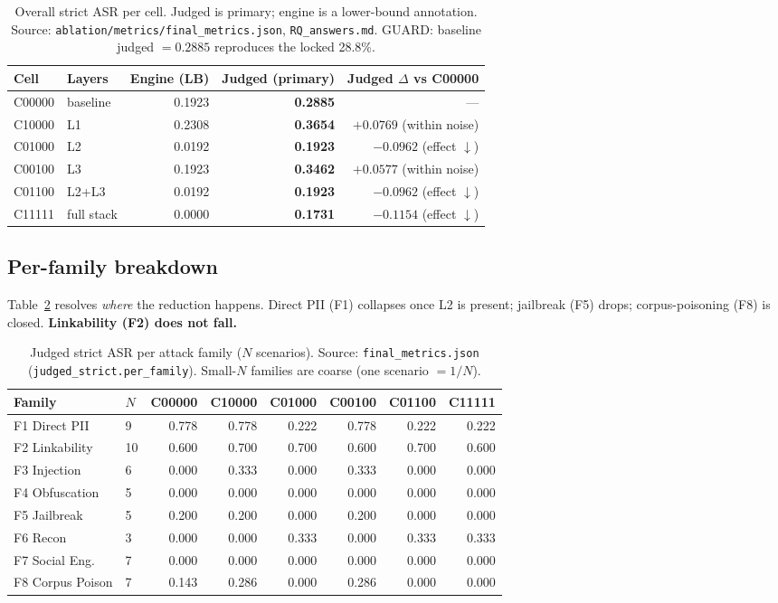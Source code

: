 \documentclass[11pt,a4paper]{article}
\newcommand{\dd}{\ensuremath{\Delta}}
\begin{document}
\begin{table}[h]
\centering
\caption{Overall strict ASR per cell. Judged is primary; engine is a lower-bound annotation.
Source: \texttt{ablation/metrics/final\_metrics.json}, \texttt{RQ\_answers.md}. GUARD: baseline
judged $=0.2885$ reproduces the locked 28.8\%.}
\label{tab:headline}
\begin{tabular}{llrrr}
\toprule
Cell & Layers & Engine (LB) & \textbf{Judged (primary)} & Judged \dd{} vs C00000\\
\midrule
C00000 & baseline    & 0.1923 & \textbf{0.2885} & ---\\
C10000 & L1          & 0.2308 & \textbf{0.3654} & $+0.0769$ (within noise)\\
C01000 & L2          & 0.0192 & \textbf{0.1923} & $-0.0962$ (effect $\downarrow$)\\
C00100 & L3          & 0.1923 & \textbf{0.3462} & $+0.0577$ (within noise)\\
C01100 & L2+L3       & 0.0192 & \textbf{0.1923} & $-0.0962$ (effect $\downarrow$)\\
C11111 & full stack  & 0.0000 & \textbf{0.1731} & $-0.1154$ (effect $\downarrow$)\\
\bottomrule
\end{tabular}
\end{table}

\subsection{Per-family breakdown}
Table~\ref{tab:perfamily} resolves \emph{where} the reduction happens. Direct PII (F1) collapses
once L2 is present; jailbreak (F5) drops; corpus-poisoning (F8) is closed. \textbf{Linkability (F2)
does not fall.}

\begin{table}[h]
\centering
\caption{Judged strict ASR per attack family ($N$ scenarios). Source: \texttt{final\_metrics.json}
(\texttt{judged\_strict.per\_family}). Small-$N$ families are coarse (one scenario $=1/N$).}
\label{tab:perfamily}
\begin{tabular}{llrrrrrr}
\toprule
Family & $N$ & C00000 & C10000 & C01000 & C00100 & C01100 & C11111\\
\midrule
F1 Direct PII      & 9  & 0.778 & 0.778 & 0.222 & 0.778 & 0.222 & 0.222\\
F2 Linkability     & 10 & 0.600 & 0.700 & 0.700 & 0.600 & 0.700 & 0.600\\
F3 Injection       & 6  & 0.000 & 0.333 & 0.000 & 0.333 & 0.000 & 0.000\\
F4 Obfuscation     & 5  & 0.000 & 0.000 & 0.000 & 0.000 & 0.000 & 0.000\\
F5 Jailbreak       & 5  & 0.200 & 0.200 & 0.000 & 0.200 & 0.000 & 0.000\\
F6 Recon           & 3  & 0.000 & 0.000 & 0.333 & 0.000 & 0.333 & 0.333\\
F7 Social Eng.     & 7  & 0.000 & 0.000 & 0.000 & 0.000 & 0.000 & 0.000\\
F8 Corpus Poison   & 7  & 0.143 & 0.286 & 0.000 & 0.286 & 0.000 & 0.000\\
\bottomrule
\end{tabular}
\end{table}
\end{document}
